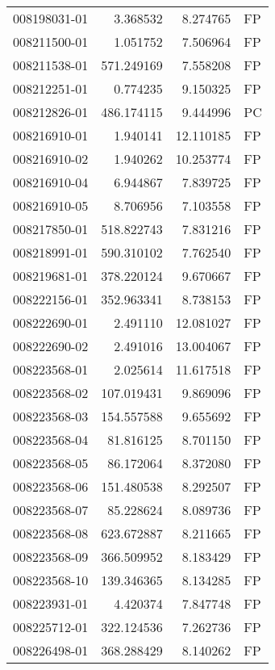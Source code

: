 \begin{tabular}{lrrl}
008198031-01 &    3.368532 &       8.274765 &   FP \\
008211500-01 &    1.051752 &       7.506964 &   FP \\
008211538-01 &  571.249169 &       7.558208 &   FP \\
008212251-01 &    0.774235 &       9.150325 &   FP \\
008212826-01 &  486.174115 &       9.444996 &   PC \\
008216910-01 &    1.940141 &      12.110185 &   FP \\
008216910-02 &    1.940262 &      10.253774 &   FP \\
008216910-04 &    6.944867 &       7.839725 &   FP \\
008216910-05 &    8.706956 &       7.103558 &   FP \\
008217850-01 &  518.822743 &       7.831216 &   FP \\
008218991-01 &  590.310102 &       7.762540 &   FP \\
008219681-01 &  378.220124 &       9.670667 &   FP \\
008222156-01 &  352.963341 &       8.738153 &   FP \\
008222690-01 &    2.491110 &      12.081027 &   FP \\
008222690-02 &    2.491016 &      13.004067 &   FP \\
008223568-01 &    2.025614 &      11.617518 &   FP \\
008223568-02 &  107.019431 &       9.869096 &   FP \\
008223568-03 &  154.557588 &       9.655692 &   FP \\
008223568-04 &   81.816125 &       8.701150 &   FP \\
008223568-05 &   86.172064 &       8.372080 &   FP \\
008223568-06 &  151.480538 &       8.292507 &   FP \\
008223568-07 &   85.228624 &       8.089736 &   FP \\
008223568-08 &  623.672887 &       8.211665 &   FP \\
008223568-09 &  366.509952 &       8.183429 &   FP \\
008223568-10 &  139.346365 &       8.134285 &   FP \\
008223931-01 &    4.420374 &       7.847748 &   FP \\
008225712-01 &  322.124536 &       7.262736 &   FP \\
008226498-01 &  368.288429 &       8.140262 &   FP \\

\end{tabular}
